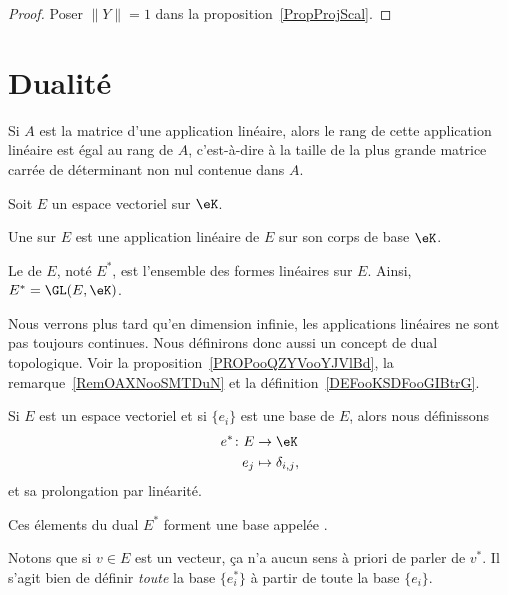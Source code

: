 \begin{proof}
	Poser \( \| Y \|=1\) dans la proposition~\ref{PropProjScal}.
\end{proof}

\section{Dualité}

\begin{proposition} \label{PropEJBZooTNFPRj}
	Si \( A\) est la matrice d'une application linéaire, alors le rang de cette application linéaire est égal au rang de \( A \), c'est-à-dire à la taille de la plus grande matrice carrée de déterminant non nul contenue dans \( A\).
\end{proposition}

\begin{definition}  \label{DefJPGSHpn}
	Soit \( E\) un espace vectoriel sur \( \eK\).

	Une  sur \( E \) est une application linéaire de \( E \) sur son corps de base \( \eK\).

	Le  de \( E\), noté \( E^*\), est l'ensemble des formes linéaires sur \( E\). Ainsi, \( E^* = \GL(E,\eK)\).
\end{definition}

Nous verrons plus tard qu'en dimension infinie, les applications linéaires ne sont pas toujours continues. Nous définirons donc aussi un concept de dual topologique. Voir la proposition~\ref{PROPooQZYVooYJVlBd}, la remarque~\ref{RemOAXNooSMTDuN} et la définition~\ref{DEFooKSDFooGIBtrG}.

\begin{lemmaDef}      \label{DEFooTMSEooZFtsqa}
	Si \( E\) est un espace vectoriel et si \( \{ e_i \}\) est une base de \( E\), alors nous définissons
	\begin{equation}
		\begin{aligned}
			e^*\colon E & \to \eK               \\
			e_j         & \mapsto \delta_{i,j},
		\end{aligned}
	\end{equation}
	et sa prolongation par linéarité.

	Ces élements du dual \( E^*\) forment une base appelée .
\end{lemmaDef}
Notons que si \( v\in E\) est un vecteur, ça n'a aucun sens à priori de parler de \( v^*\). Il s'agit bien de définir \emph{toute} la base \( \{ e_i^* \}\) à partir de toute la base \( \{ e_i \}\).

